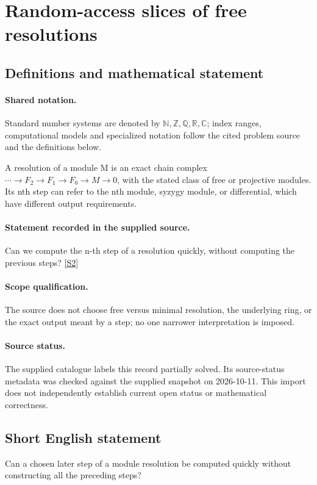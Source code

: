 \documentclass[11pt]{article}
\newcommand{\sref}[2]{\hyperlink{source:#1:#2}{[S#2]}}
\begin{document}
\section{Random-access slices of free resolutions}\label{statement}

\subsection{Definitions and mathematical statement}

\paragraph{Shared notation.}Standard number systems are denoted by $\mathbb N,\mathbb Z,\mathbb Q,\mathbb R,\mathbb C$; index ranges, computational models and specialized notation follow the cited problem source and the definitions below.


A resolution of a module M is an exact chain complex $\cdots\to F_2\to F_1\to F_0\to M\to0$, with the stated class of free or projective modules. Its nth step can refer to the nth module, syzygy module, or differential, which have different output requirements.
\paragraph{Statement recorded in the supplied source.}
Can we compute the n-th step of a resolution quickly, without computing the previous steps? \sref{statement}{2}
\paragraph{Scope qualification.}
The source does not choose free versus minimal resolution, the underlying ring, or the exact output meant by a step; no one narrower interpretation is imposed.
\paragraph{Source status.}
The supplied catalogue labels this record partially solved. Its source-status metadata was checked against the supplied snapshot on 2026-10-11. This import does not independently establish current open status or mathematical correctness.
\subsection{Short English statement}
Can a chosen later step of a module resolution be computed quickly without constructing all the preceding steps?
\end{document}
